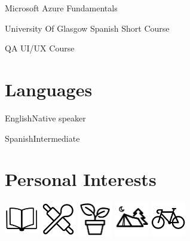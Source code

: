 \documentclass{tccv}
\begin{document}
\begin{factlist}
\item{}{Microsoft Azure Fundamentals}
\item{}{University Of Glasgow Spanish Short Course}
\item{}{QA UI/UX Course}
\end{factlist}

\section{Languages}

\begin{factlist}
\item{English}{Native speaker}
\item{Spanish}{Intermediate}
\end{factlist}



    
     
	 
	
\section{Personal Interests}

\includegraphics[width=1.5cm, height=1.5cm]{book-bw}
\includegraphics[width=1.5cm, height=1.5cm]{cooking-bw}
\includegraphics[width=1.5cm, height=1.5cm]{plant-bw}
\includegraphics[width=1.5cm, height=1.5cm]{camp-bw}
\includegraphics[width=1.5cm, height=1.5cm]{bicycle-bw}
\end{document}
